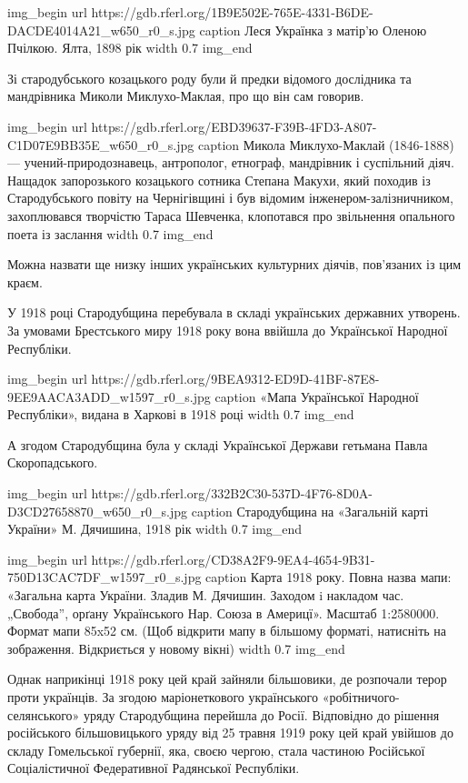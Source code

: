 \ifcmt
img_begin 
  url https://gdb.rferl.org/1B9E502E-765E-4331-B6DE-DACDE4014A21_w650_r0_s.jpg
  caption Леся Українка з матір’ю Оленою Пчілкою. Ялта, 1898 рік
  width 0.7
img_end
\fi

Зі стародубського козацького роду були й предки відомого дослідника та
мандрівника Миколи Миклухо-Маклая, про що він сам говорив.

\ifcmt
img_begin 
  url https://gdb.rferl.org/EBD39637-F39B-4FD3-A807-C1D07E9BB35E_w650_r0_s.jpg
  caption Микола Миклухо-Маклай (1846-1888) --- учений-природознавець,
  антрополог, етнограф, мандрівник і суспільний діяч. Нащадок запорозького
  козацького сотника Степана Макухи, який походив із Стародубського повіту на
  Чернігівщині і був відомим інженером-залізничником, захоплювався творчістю
  Тараса Шевченка, клопотався про звільнення опального поета із заслання
  width 0.7
img_end
\fi

Можна назвати ще низку інших українських культурних діячів, пов’язаних із цим
краєм.

У 1918 році Стародубщина перебувала в складі українських державних утворень. За
умовами Брестського миру 1918 року вона ввійшла до Української Народної
Республіки.

\ifcmt
img_begin 
  url https://gdb.rferl.org/9BEA9312-ED9D-41BF-87E8-9EE9AACA3ADD_w1597_r0_s.jpg
  caption «Мапа Української Народної Республіки», видана в Харкові в 1918 році
  width 0.7
img_end
\fi

А згодом Стародубщина була у складі Української Держави гетьмана Павла Скоропадського.

\ifcmt
img_begin 
  url https://gdb.rferl.org/332B2C30-537D-4F76-8D0A-D3CD27658870_w650_r0_s.jpg
  caption Стародубщина на «Загальній карті України» М. Дячишина, 1918 рік
  width 0.7
img_end
\fi

\ifcmt
img_begin 
  url https://gdb.rferl.org/CD38A2F9-9EA4-4654-9B31-750D13CAC7DF_w1597_r0_s.jpg
  caption Карта 1918 року. Повна назва мапи: «Загальна карта України. Зладив М.
  Дячишин. Заходом i накладом час. „Свобода”, орґану Українського Нар. Союза в
  Америцї». Масштаб 1:2580000. Формат мапи 85x52 см. (Щоб відкрити мапу в
  більшому форматі, натисніть на зображення. Відкриється у новому вікні)
  width 0.7
img_end
\fi

Однак наприкінці 1918 року цей край зайняли більшовики, де розпочали терор
проти українців. За згодою маріонеткового українського
«робітничого-селянського» уряду Стародубщина перейшла до Росії. Відповідно до
рішення російського більшовицького уряду від 25 травня 1919 року цей край
увійшов до складу Гомельської губернії, яка, своєю чергою, стала частиною
Російської Соціалістичної Федеративної Радянської Республіки.

